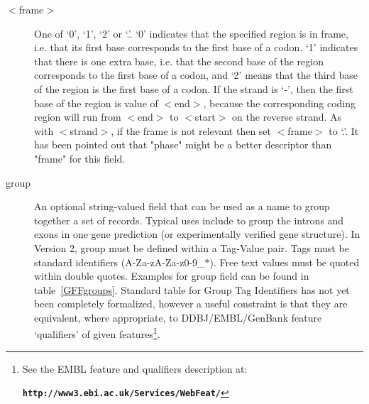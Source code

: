 \begin{description}
\item[$<$frame$>$] One of `0', `1', `2' or `.'. `0' indicates that the specified region is in frame, i.e. that its first base corresponds to the first base of a codon. `1' indicates that there is one extra base, i.e. that the second base of the region corresponds to the first base of a codon, and `2' means that the third base of the region is the first base of a codon. If the strand is `-', then the first base of the region is value of $<$end$>$, because the corresponding coding region will run from $<$end$>$ to $<$start$>$ on the reverse strand. As with $<$strand$>$, if the frame is not relevant then set $<$frame$>$ to `.'. It has been pointed out that "phase" might be a better descriptor than "frame" for this field.
\item[group] An optional string-valued field that can be used as a name to group together a set of records. Typical uses include to group the introns and exons in one gene prediction (or experimentally verified gene structure). In Version 2, group must be defined within a Tag-Value pair. Tags must be standard identifiers (A-Za-zA-Za-z0-9\_$\ast$). Free text values must be quoted within double quotes. Examples for group field can be found in table~\ref{GFFgroups}. Standard table for Group Tag Identifiers has not yet been completely formalized, however a useful constraint is that they are equivalent, where appropriate, to DDBJ/EMBL/GenBank feature `qualifiers' of given features\footnote{See the EMBL feature and qualifiers description at:\\\centerline{\bfseries\texttt{http://www3.ebi.ac.uk/Services/WebFeat/}}}.
\end{description}

